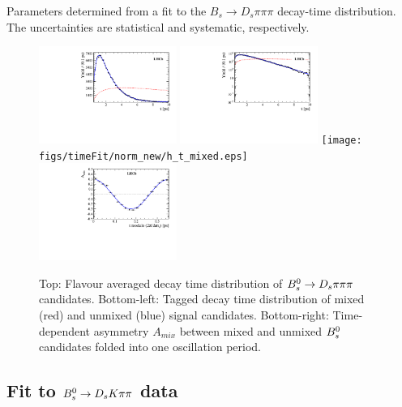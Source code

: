 \begin{table}[h]
\centering
\footnotesize
\caption{\small Parameters determined from a fit to the $B_s \to D_s \pi \pi\pi$ decay-time distribution. The uncertainties are statistical and systematic, respectively.}
	\renewcommand{\arraystretch}{1.25}
	
\label{tab:normFitResults}
\end{table}

\begin{figure}[h]
	\centering
		\includegraphics[width=0.4\textwidth, height = !]{figs/timeFit/norm_new/h_t.pdf} 
		\includegraphics[width=0.4\textwidth, height = !]{figs/timeFit/norm_new/h_t_log.pdf} 
		\texttt{[image: figs/timeFit/norm\_new/h\_t\_mixed.eps]} 
		\includegraphics[width=0.4\textwidth, height = !]{figs/timeFit/norm_new/h_asym.pdf} 		
		\caption{
		\footnotesize Top: Flavour averaged decay time distribution of ${{B}^0_{s}}\rightarrow{\ensuremath{{D}_{s}}}{\ensuremath{\pi}}{\ensuremath{\pi}}{\ensuremath{\pi}}$ candidates. 
Bottom-left: Tagged decay time distribution of mixed (red) and unmixed (blue) signal candidates. 
Bottom-right: Time-dependent asymmetry $A_{mix}$ between mixed and unmixed ${{B}^0_{s}}$ candidates folded into one oscillation period.} 		
		\label{fig:tFitNorm}
\end{figure}	

\subsection{Fit to ${{B}^0_{s}}\rightarrow{\ensuremath{{D}_{s}}}{\ensuremath{K}}{\ensuremath{\pi}}{\ensuremath{\pi}}$ data}
\label{ssec:timeFit}

